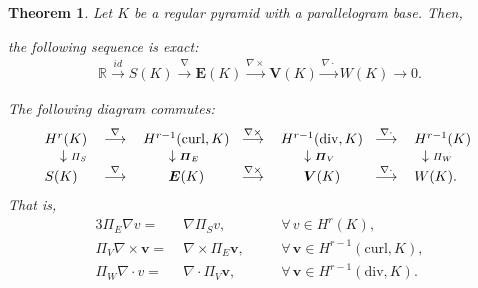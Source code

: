 \documentclass[twoside,reqno,final]{amsart}
\newtheorem{theorem}{Theorem}
\renewcommand{\b}[1]{{\boldsymbol{#1}}}
\newcommand{\bR}{\mathbb R}
\newcommand{\curls}{{{\nabla\times}}}
\newcommand{\divs}{{\nabla\cdot}}
\newcommand{\grads}{{\nabla}}
\begin{document}
\begin{theorem}
 \label{thm-commute}
 Let $K$ be a regular pyramid with a parallelogram base. Then,
 
{\em{}} the following sequence is exact:
\begin{align*}
 \bR
\overset{id}{\longrightarrow}
S(K)
\overset{\grads}{\longrightarrow} 
\b E( K)
\overset{\curls}{\longrightarrow} 
\b V(K)
\overset{\divs}{\longrightarrow} 
W(K)
\overset{}{\longrightarrow} 0.
\end{align*}


{\em {}}
The following diagram {\em commutes}:
\begin{alignat*}{2}
\begin{tabular}{l c c c c c l l}
$H^r({K})$&
$\overset{\grads}{\longrightarrow} $&
$H^{r-1}(\mathrm{curl},K)\!\!$&
$\overset{\curls}{\longrightarrow} $&
$H^{r-1}(\mathrm{div},K)\!\!$&
$\overset{\divs}{\longrightarrow} $&
$H^{r-1}(K)\;$\\
$\;\;\;\;\downarrow {\scriptstyle \varPi_S}$ & &
$\downarrow{\scriptstyle\b \varPi_E}$
& &$\downarrow{\scriptstyle\b \varPi_V}$
& &
$\;\;\downarrow{\scriptstyle \varPi_W}$
\\
$S(K)\!\!$&
$\overset{\grads}{\longrightarrow}$ &
$\b E(K)\!\!$&
$\overset{\curls}{\longrightarrow}$ &
$\b V(K)\!\!$&
$\overset{\divs}{\longrightarrow}$ &
$W(K)$.
\end{tabular}
\end{alignat*}
That is,
\begin{alignat*}{3}
 \b\varPi_E\grads v = &\; \grads \varPi_S v, \quad && \forall \, v\in H^r(K),\\
 \b\varPi_V\curls\b v = &\; \curls \b\varPi_E\b v, \quad && \forall \,\b v\in H^{r-1}(\mathrm{curl},K),\\
\varPi_W\divs v = &\; \divs\b \varPi_V\b v, \quad && \forall\,\b v \in H^{r-1}(\mathrm{div},K).
\end{alignat*}


\end{theorem}
\end{document}
